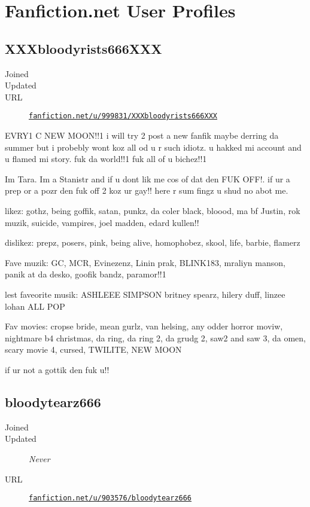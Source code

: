 \cleardoublepage\chapter{Fanfiction.net User Profiles}

\section{XXXbloodyrists666XXX}
\begin{description}
	\item[Joined] 
	\item[Updated] 
	\item[URL] \href{https://www.fanfiction.net/u/999831/XXXbloodyrists666XXX}{\texttt{fanfiction.net/u/999831/XXXbloodyrists666XXX}}
\end{description}

EVRY1 C NEW MOON!!1 i will try 2 post a new fanfik
maybe derring da summer but i probebly wont koz all
od u r such idiotz. u hakked mi account and u flamed
mi story. fuk da world!!1 fuk all of u bichez!!1

Im Tara. Im a Stanistr and if u dont lik me cos of
dat den FUK OFF!. if ur a prep or a pozr den fuk off
2 koz ur gay!! here r sum fingz u shud no abot me.

likez: gothz, being goffik, satan, punkz, da coler
black, bloood, ma bf Justin, rok muzik, suicide,
vampires, joel madden, edard kullen!!

dislikez: prepz, posers, pink, being alive,
homophobez, skool, life, barbie, flamerz

Fave muzik: GC, MCR, Evinezenz, Linin prak, BLINK183,
mraliyn manson, panik at da desko, goofik bandz, paramor!!1

\begin{sloppypar}
	lest faveorite musik: ASHLEEE SIMPSON britney spearz,
	hilery duff, linzee lohan ALL POP
\end{sloppypar}

\begin{sloppypar}
	Fav movies: cropse bride, mean gurlz, van helsing, any
	odder horror moviw, nightmare b4 christmas, da ring,
	da ring 2, da grudg 2, saw2 and saw 3, da omen, scary movie 4,
	cursed, TWILITE, NEW MOON
\end{sloppypar}

if ur not a gottik den fuk u!!

\section{bloodytearz666}
\begin{description}
	\item[Joined] 
	\item[Updated] \textit{Never} %
	\item[URL] \href{https://www.fanfiction.net/u/903576/bloodytearz666}{\texttt{fanfiction.net/u/903576/bloodytearz666}}
\end{description}

